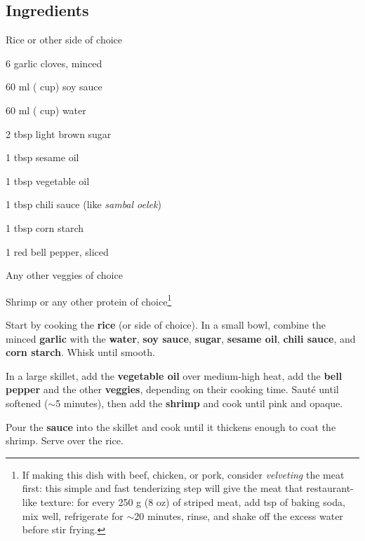 \newpage
{}

\subsection*{Ingredients}
\begin{ingredients}
	\item Rice or other side of choice
	\item 6 garlic cloves, minced
	\item 60 ml ( cup) soy sauce
	\item 60 ml ( cup) water
	\item 2 tbsp light brown sugar
	\item 1 tbsp sesame oil
	\item 1 tbsp vegetable oil
	\item 1 tbsp chili sauce (like \textit{sambal oelek})
	\item 1 tbsp corn starch
	\item 1 red bell pepper, sliced
	\item Any other veggies of choice
	\item Shrimp or any other protein of choice\footnote{If making this dish with beef, chicken, or pork, consider \textit{velveting} the meat first: this simple and fast tenderizing step will give the meat that restaurant-like texture: for every 250 g (8 oz) of striped meat, add  tsp of baking soda, mix well, refrigerate for $\sim$20 minutes, rinse, and shake off the excess water before stir frying.}
\end{ingredients}

\medskip

Start by cooking the \textbf{rice} (or side of choice).
In a small bowl, combine the minced \textbf{garlic} with the \textbf{water}, \textbf{soy sauce}, \textbf{sugar}, \textbf{sesame oil}, \textbf{chili sauce}, and \textbf{corn starch}. 
Whisk until smooth.

In a large skillet, add the \textbf{vegetable oil} over medium-high heat, add the \textbf{bell pepper} and the other \textbf{veggies}, depending on their cooking time.
Sauté until softened ($\sim$5 minutes), then add the \textbf{shrimp} and cook until pink and opaque.

Pour the \textbf{sauce} into the skillet and cook until it thickens enough to coat the shrimp.
Serve over the rice. 

\vspace*{0.75 cm}

\begin{recipeblock}
	
\end{recipeblock}
